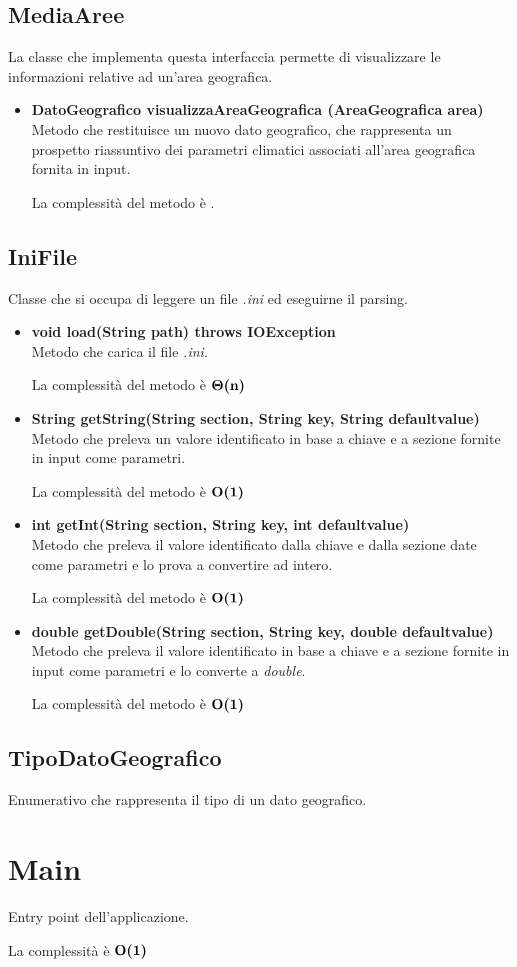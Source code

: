 \documentclass[a4paper, 12pt]{scrreprt}
\begin{document}
			\subsection{MediaAree}
			La classe che implementa questa interfaccia permette di visualizzare le informazioni relative ad un'area geografica.
			\begin{itemize}
				\item\textbf {DatoGeografico visualizzaAreaGeografica (AreaGeografica area)}
				\\Metodo che restituisce un nuovo dato geografico, che rappresenta un prospetto riassuntivo dei parametri climatici associati all'area geografica fornita in input.
				
				La complessit\`a del metodo \`e .
				
			\end{itemize}
			
			\subsection{IniFile}
			Classe che si occupa di leggere un file \textit{.ini} ed eseguirne il parsing.
			\begin{itemize}
				\item \textbf{void load(String path) throws IOException}
				\\Metodo che carica il file \textit{.ini}.
				
				La complessit\`a del metodo \`e $\mathbf{\Theta}\textbf{(n)}$
				
				\item \textbf{String getString(String section, String key, String defaultvalue)}
				\\Metodo che preleva un valore identificato in base a chiave e a sezione fornite in input come parametri.
				
				La complessit\`a del metodo \`e $\mathbf{O}\textbf{(1)}$
				
				\item \textbf{int getInt(String section, String key, int defaultvalue)}
				\\Metodo che preleva il valore identificato dalla chiave e dalla sezione date come parametri e lo prova a convertire ad intero.
				
				La complessit\`a del metodo \`e $\mathbf{O}\textbf{(1)}$
				
				\item \textbf{double getDouble(String section, String key, double defaultvalue)}
				\\Metodo che preleva il valore identificato in base a chiave e a sezione fornite in input come parametri e lo converte a \textit{double}.
				
				La complessit\`a del metodo \`e $\mathbf{O}\textbf{(1)}$
				
				
			\end{itemize}
			\subsection{TipoDatoGeografico}
			Enumerativo che rappresenta il tipo di un dato geografico.


		\section{Main}
		Entry point dell'applicazione.
		
		La complessit\`a \`e $\mathbf{O}\textbf{(1)}$

	\nocite{IuriTex}
	
	
	\printindex
\end{document}
